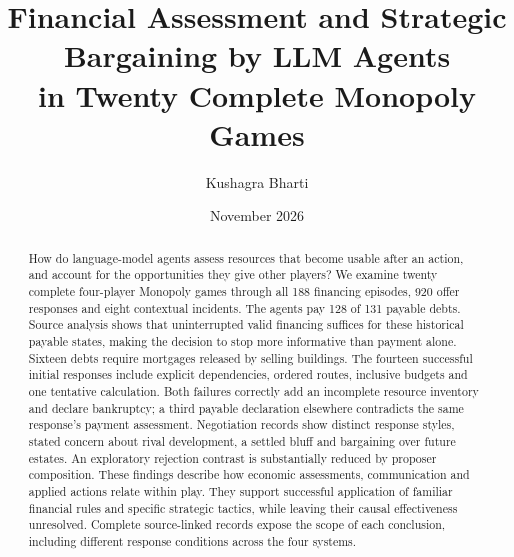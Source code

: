 \documentclass[10pt,twocolumn,letterpaper]{article}
\title{Financial Assessment and Strategic Bargaining by LLM Agents\\in Twenty Complete Monopoly Games}
\author{Kushagra Bharti}
\date{November 2026}
\begin{document}
\maketitle
\begin{abstract}
How do language-model agents assess resources that become usable after an action, and account for the opportunities they give other players? We examine twenty complete four-player Monopoly games through all 188 financing episodes, 920 offer responses and eight contextual incidents. The agents pay 128 of 131 payable debts. Source analysis shows that uninterrupted valid financing suffices for these historical payable states, making the decision to stop more informative than payment alone. Sixteen debts require mortgages released by selling buildings. The fourteen successful initial responses include explicit dependencies, ordered routes, inclusive budgets and one tentative calculation. Both failures correctly add an incomplete resource inventory and declare bankruptcy; a third payable declaration elsewhere contradicts the same response's payment assessment. Negotiation records show distinct response styles, stated concern about rival development, a settled bluff and bargaining over future estates. An exploratory rejection contrast is substantially reduced by proposer composition. These findings describe how economic assessments, communication and applied actions relate within play. They support successful application of familiar financial rules and specific strategic tactics, while leaving their causal effectiveness unresolved. Complete source-linked records expose the scope of each conclusion, including different response conditions across the four systems.
\end{abstract}

\label{main-end}


\clearpage\onecolumn\appendix

\end{document}
